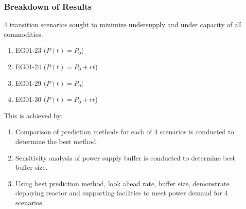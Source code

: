 \begin{frame}
    \frametitle{Breakdown of Results}
    4 transition scenarios sought to minimize undersupply and under capacity of 
        all commodities.
    \begin{enumerate}
            \item EG01-23 ($P(t) = P_0$)
        \item EG01-24 ($P(t) = P_0 + rt$)
        \item EG01-29 ($P(t) = P_0)$
        \item EG01-30 ($P(t) = P_0 + rt$)
    \end{enumerate}

This is achieved by:
\begin{enumerate}
    \item Comparison of prediction methods for each of 4 scenarios is conducted 
    to determine the best method. 
    \item Sensitivity analysis of power supply buffer is conducted to determine 
    best buffer size. 
    \item Using best prediction method, look ahead rate, buffer size, demonstrate \deploy 
    deploying reactor and supporting facilities to meet power demand 
    for 4 scenarios. 
\end{enumerate}

\end{frame}
